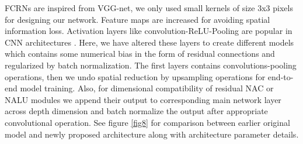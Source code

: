 \documentclass[runningheads]{llncs}
\begin{document}
FCRNs are inspired from VGG-net, we only used small kernels of size 3x3 pixels for designing our network. Feature maps are increased for avoiding spatial information loss. Activation layers like convolution-ReLU-Pooling are popular in CNN architectures \cite{b24}. Here, we have altered these layers to create different models which contains some numerical bias in the form of residual connections and regularized by batch normalization. The first layers contains convolutions-pooling operations, then we undo spatial reduction by upsampling operations for end-to-end model training. Also, for dimensional compatibility of residual NAC or NALU modules we append their output to corresponding main network layer across depth dimension and batch normalize the output after appropriate convolutional operation. See figure \ref{fig8} for comparison between earlier original model and newly proposed architecture along with architecture parameter details.
\end{document}
